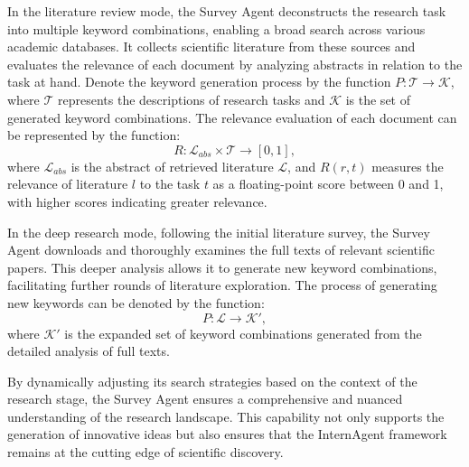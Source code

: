 In the literature review mode, the Survey Agent deconstructs the research task into multiple keyword combinations, enabling a broad search across various academic databases. It collects scientific literature from these sources and evaluates the relevance of each document by analyzing abstracts in relation to the task at hand. Denote the keyword generation process by the function $ P: \mathcal{T} \rightarrow \mathcal{K} $, where $\mathcal{T}$ represents the descriptions of research tasks and $\mathcal{K}$ is the set of generated keyword combinations. The relevance evaluation of each document can be represented by the function:
\begin{equation}
    R: \mathcal{L}_{abs} \times \mathcal{T} \rightarrow [0, 1],
\end{equation}
where $\mathcal{L}_{abs}$ is the abstract of retrieved literature $\mathcal{L}$, and $R(r, t)$ measures the relevance of literature $l$ to the task $t$ as a floating-point score between 0 and 1, with higher scores indicating greater relevance.

In the deep research mode, following the initial literature survey, the Survey Agent downloads and thoroughly examines the full texts of relevant scientific papers. This deeper analysis allows it to generate new keyword combinations, facilitating further rounds of literature exploration. The process of generating new keywords can be denoted by the function:
\begin{equation}
    P: \mathcal{L} \rightarrow \mathcal{K}',
\end{equation}
where $\mathcal{K}'$ is the expanded set of keyword combinations generated from the detailed analysis of full texts. 

By dynamically adjusting its search strategies based on the context of the research stage, the Survey Agent ensures a comprehensive and nuanced understanding of the research landscape. This capability not only supports the generation of innovative ideas but also ensures that the InternAgent framework remains at the cutting edge of scientific discovery.

